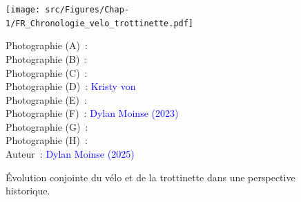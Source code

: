 \begin{refsegment}
    \begin{figure}[h!]\vspace*{4pt}
        \caption{Évolution conjointe du vélo et de la trottinette dans une perspective historique.}
        \label{fig-chap1:frise-chronologique-velo-trottinette}
        \centerline{\texttt{[image: src/Figures/Chap-1/FR\_Chronologie\_velo\_trottinette.pdf]}}
        \vspace{5pt}
        \begin{flushright}\scriptsize{
        Photographie (A)~: \textcolor{blue}{\textcite{smithsonian_draisine_2006}}
        \\
        Photographie (B)~: \textcolor{blue}{\textcite{conservatoire_national_des_arts_et_metiers_velocipemichaux_2013}}
        \\
        Photographie (C)~: \textcolor{blue}{\textcite{chateau_de_compiegne_grand-bi_nodate}}
        \\
        Photographie (D)~: \textcolor{blue}{Kristy von} \textcolor{blue}{\textcite{moos_parcours_2019}}
        \\
        Photographie (E)~: \textcolor{blue}{\textcite{alienor_bicyclette_2015}}
        \\
        Photographie (F)~: \textcolor{blue}{Dylan Moinse (2023)}
        \\
        Photographie (G)~: \textcolor{blue}{\textcite{musee_national_suisse_draisienne_2018}}
        \\
        Photographie (H)~: \textcolor{blue}{\textcite{zerorider_lautoped_2023}}
        \\
        Auteur~: \textcolor{blue}{Dylan Moinse (2025)}
      }\end{flushright}
    \end{figure}


\end{refsegment}
